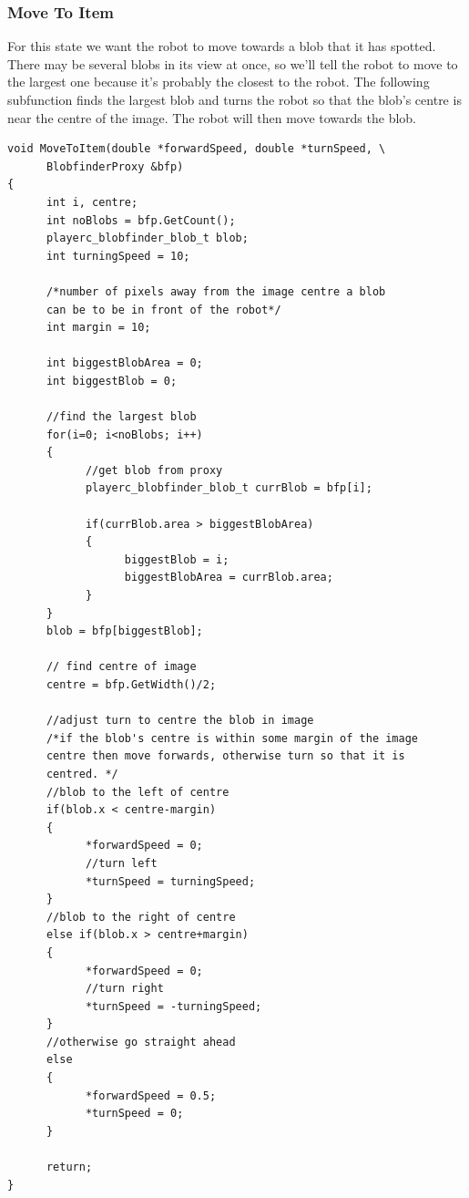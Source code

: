 \documentclass[a4paper]{report}
\begin{document}
\subsubsection{Move To Item}
For this state we want the robot to move towards a blob that it has spotted. There may be several blobs in its view at once, so we'll tell the robot to move to the largest one because it's probably the closest to the robot. The following subfunction finds the largest blob and turns the robot so that the blob's centre is near the centre of the image. The robot will then move towards the blob.
\begin{verbatim}
void MoveToItem(double *forwardSpeed, double *turnSpeed, \
      BlobfinderProxy &bfp)
{
      int i, centre;
      int noBlobs = bfp.GetCount();
      playerc_blobfinder_blob_t blob;
      int turningSpeed = 10;
      
      /*number of pixels away from the image centre a blob
      can be to be in front of the robot*/
      int margin = 10;
      
      int biggestBlobArea = 0;
      int biggestBlob = 0;
      
      //find the largest blob
      for(i=0; i<noBlobs; i++)
      {
            //get blob from proxy
            playerc_blobfinder_blob_t currBlob = bfp[i];
            
            if(currBlob.area > biggestBlobArea)
            {
                  biggestBlob = i;
                  biggestBlobArea = currBlob.area;
            }
      }
      blob = bfp[biggestBlob];
            
      // find centre of image
      centre = bfp.GetWidth()/2;
      
      //adjust turn to centre the blob in image
      /*if the blob's centre is within some margin of the image 
      centre then move forwards, otherwise turn so that it is 
      centred. */
      //blob to the left of centre
      if(blob.x < centre-margin)
      {
            *forwardSpeed = 0;
            //turn left
            *turnSpeed = turningSpeed;
      }
      //blob to the right of centre
      else if(blob.x > centre+margin)
      {
            *forwardSpeed = 0;
            //turn right
            *turnSpeed = -turningSpeed;
      }
      //otherwise go straight ahead
      else
      {
            *forwardSpeed = 0.5;
            *turnSpeed = 0;      
      }
      
      return;
}
\end{verbatim}
\end{document}
